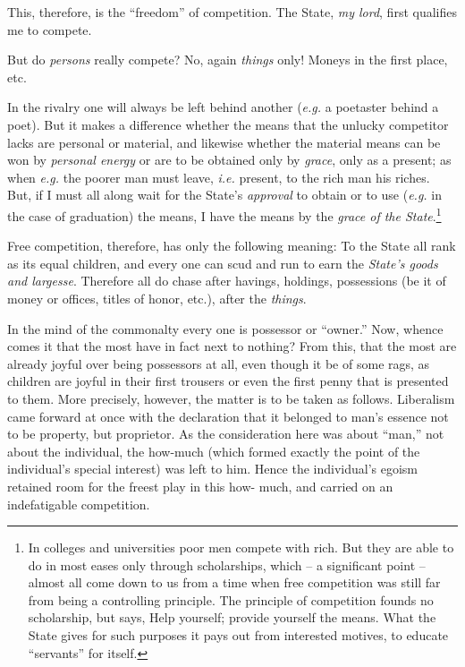 \documentclass[12pt,a4paper]{book}
\begin{document}
This, therefore, is the ``freedom'' of competition. The State, \textit{my 
lord}, first qualifies me to compete.

But do \textit{persons} really compete? No, again \textit{things} only! Moneys 
in the first place, etc.

In the rivalry one will always be left behind another (\textit{e.g.} a 
poetaster behind a poet). But it makes a difference whether the means that the 
unlucky competitor lacks are personal or material, and likewise whether the 
material means can be won by \textit{personal energy} or are to be obtained 
only by \textit{grace}, only as a present; as when \textit{e.g.} the poorer 
man must leave, \textit{i.e.} present, to the rich man his riches. But, if I 
must all along wait for the State's \textit{approval} to obtain or to use 
(\textit{e.g.} in the case of graduation) the means, I have the means by the 
\textit{grace of the State}.\footnote{In colleges and universities poor men 
compete with rich. But they are able to do in most eases only through 
scholarships, which -- a significant point -- almost all come down to us from 
a time when free competition was still far from being a controlling principle. 
The principle of competition founds no scholarship, but says, Help yourself; 
provide yourself the means. What the State gives for such purposes it pays out 
from interested motives, to educate ``servants'' for itself.}

Free competition, therefore, has only the following meaning: To the State all 
rank as its equal children, and every one can scud and run to earn the 
\textit{State's goods and largesse}. Therefore all do chase after havings, 
holdings, possessions (be it of money or offices, titles of honor, etc.), 
after the \textit{things}.

In the mind of the commonalty every one is possessor or ``owner.'' Now, 
whence comes it that the most have in fact next to nothing? From this, that 
the most are already joyful over being possessors at all, even though it be of 
some rags, as children are joyful in their first trousers or even the first 
penny that is presented to them. More precisely, however, the matter is to be 
taken as follows. Liberalism came forward at once with the declaration that it 
belonged to man's essence not to be property, but proprietor. As the 
consideration here was about ``man,'' not about the individual, the how-much 
(which formed exactly the point of the individual's special interest) was left 
to him. Hence the individual's egoism retained room for the freest play in 
this how- much, and carried on an indefatigable competition.
\end{document}
